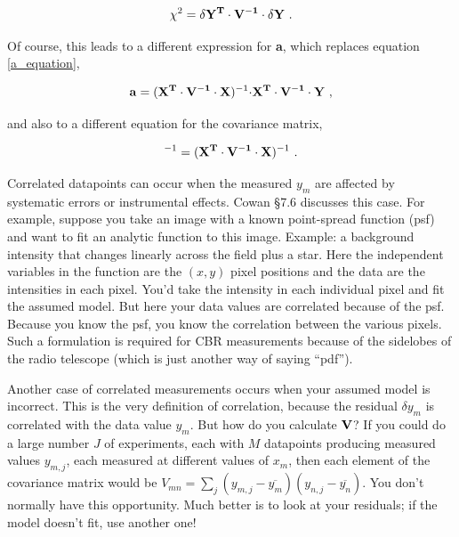 \documentclass[psfig,preprint]{aastex}
\begin{document}
\begin{mathletters}
\begin{equation}
\label{chisq_cov}
\chi^2 =  {\bf \delta Y^T \cdot V^{-1} \cdot \delta Y} \ .
\end{equation}

\noindent Of course, this leads to a different expression for {\bf a},
which replaces equation \ref{a_equation},

\begin{equation}
{\bf a} = ({\bf X^T \cdot V^{-1} \cdot X})^{-1} 
	{\bf \cdot X^T \cdot V^{-1} \cdot Y}  \ ,
\end{equation}

\noindent and also to a different equation for the covariance matrix,

\begin{equation}
[\alpha]^{-1} = ({\bf X^T \cdot V^{-1} \cdot X})^{-1} \ .
\end{equation}
\end{mathletters}

	Correlated datapoints can occur when the measured $y_m$ are
affected by systematic errors or instrumental effects.  Cowan \S 7.6
discusses this case.  For example, suppose you take an image with a
known point-spread function (psf) and want to fit an analytic function
to this image.  Example: a background intensity that changes linearly
across the field plus a star.  Here the independent variables in the
function are the $(x,y)$ pixel positions and the data are the
intensities in each pixel.  You'd take the intensity in each individual
pixel and fit the assumed model.  But here your data values are
correlated because of the psf.  Because you know the psf, you know the
correlation between the various pixels.  Such a formulation is required
for CBR measurements because of the sidelobes of the radio telescope
(which is just another way of saying ``pdf'').

	Another case of correlated measurements occurs when your assumed
model is incorrect.  This is the very definition of correlation, because
the residual $\delta y_m$ is correlated with the data value $y_m$.  But
how do you calculate ${\bf V}$? If you could do a large number $J$ of
experiments, each with $M$ datapoints producing measured values
$y_{m,j}$, each measured at different values of $x_{m}$, then each
element of the covariance matrix would be $V_{mn} = \sum_j (y_{m,j} -
\overline{y_m}) (y_{n,j} - \overline{y_n})$.  You don't normally have
this opportunity.  Much better is to look at your residuals; if the
model doesn't fit, use another one!
\end{document}
